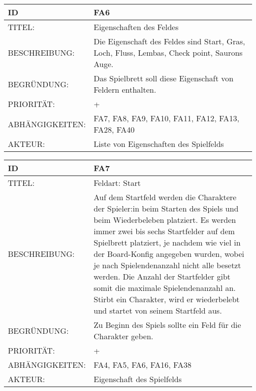 \documentclass{uulm-assignment}
\begin{document}
    \begin{tabularx}{\textwidth}{|l|X |} \hline
        \textbf{ID} & \textbf{FA6} \\
        \hline
        TITEL: &  Eigenschaften des Feldes \\
        \hline
        BESCHREIBUNG: & Die Eigenschaft des Feldes sind Start, Gras, Loch, Fluss, Lembas, Check point, Saurons Auge.
        \\
        \hline
        BEGRÜNDUNG: & Das Spielbrett soll diese Eigenschaft von Feldern enthalten. \\
        \hline
        PRIORITÄT: & +\\
        \hline
        ABHÄNGIGKEITEN: & FA7, FA8, FA9, FA10, FA11, FA12, FA13, FA28, FA40\\
        \hline
        AKTEUR: & Liste von Eigenschaften des Spielfelds \\
        \hline
    \end{tabularx}
    
    \begin{tabularx}{\textwidth}{|l|X |} \hline
        \textbf{ID} & \textbf{FA7} \\
        \hline
        TITEL: &  Feldart: Start\\
        \hline
        BESCHREIBUNG: & Auf dem Startfeld werden die Charaktere der Spieler:in beim Starten des
        Spiels und beim Wiederbeleben platziert. Es werden immer zwei bis sechs Startfelder auf dem Spielbrett platziert, je nachdem wie viel in der Board-Konfig angegeben
wurden, wobei je nach Spielendenanzahl nicht alle besetzt werden. Die Anzahl der
Startfelder gibt somit die maximale Spielendenanzahl an. Stirbt ein Charakter,
wird er wiederbelebt und startet von seinem Startfeld aus.
        \\
        \hline
        BEGRÜNDUNG: & Zu Beginn des Spiels sollte ein Feld für die Charakter geben. \\
        \hline
        PRIORITÄT: & +\\
        \hline
        ABHÄNGIGKEITEN: & FA4, FA5, FA6, FA16, FA38 \\
        \hline
        AKTEUR: &  Eigenschaft des Spielfelds\\
        \hline
    \end{tabularx}
    
\end{document}
